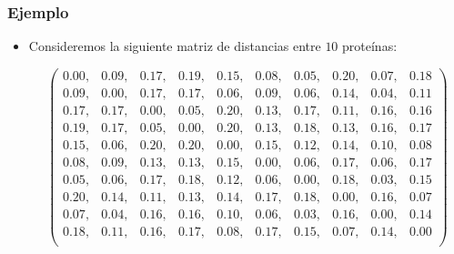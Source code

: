\begin{frame}
\frametitle{Ejemplo}
\begin{itemize}
\item<2->{Consideremos la siguiente matriz de distancias entre $10$ proteínas:
{\tiny 
\begin{center}
$$\left(\begin{array}{rrrrrrrrrr}
0.00, & 0.09, & 0.17, & 0.19, & 0.15, & 0.08, & 0.05, & 0.20, & 0.07, & 0.18 \\
0.09, & 0.00, & 0.17, & 0.17, & 0.06, & 0.09, & 0.06, & 0.14, & 0.04, & 0.11 \\
0.17, & 0.17, & 0.00, & 0.05, & 0.20, & 0.13, & 0.17, & 0.11, & 0.16, & 0.16 \\
0.19, & 0.17, & 0.05, & 0.00, & 0.20, & 0.13, & 0.18, & 0.13, & 0.16, & 0.17 \\
0.15, & 0.06, & 0.20, & 0.20, & 0.00, & 0.15, & 0.12, & 0.14, & 0.10, & 0.08 \\
0.08, & 0.09, & 0.13, & 0.13, & 0.15, & 0.00, & 0.06, & 0.17, & 0.06, & 0.17 \\
0.05, & 0.06, & 0.17, & 0.18, & 0.12, & 0.06, & 0.00, & 0.18, & 0.03, & 0.15 \\
0.20, & 0.14, & 0.11, & 0.13, & 0.14, & 0.17, & 0.18, & 0.00, & 0.16, & 0.07 \\
0.07, & 0.04, & 0.16, & 0.16, & 0.10, & 0.06, & 0.03, & 0.16, & 0.00, & 0.14 \\
0.18, & 0.11, & 0.16, & 0.17, & 0.08, & 0.17, & 0.15, & 0.07, & 0.14, & 0.00 \\
\end{array}\right)
$$
\end{center}
}
}
\end{itemize}
\end{frame}

